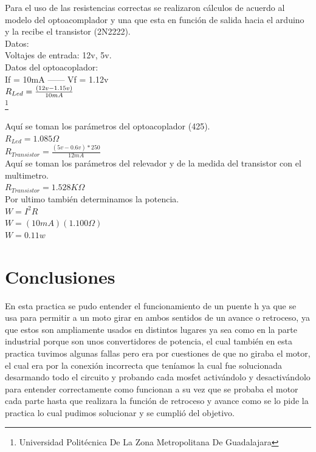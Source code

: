 \documentclass[10pt,a4paper]{article}
\begin{document}
Para el uso de las resistencias correctas se realizaron cálculos de acuerdo al modelo del optoacomplador y una que esta en función de salida hacia el arduino y la recibe el transistor (2N2222).\\
Datos:\\

Voltajes de entrada: 12v, 5v.\\

Datos del optoacoplador:\\

If = 10mA ------
Vf = 1.12v\\

{\Large $ R_{Led} = {\Large \frac{(12v - 1.15v)}{10mA}}$} \\


\footnote{Universidad Politécnica De La Zona Metropolitana De Guadalajara}
\newpage

Aquí se toman los parámetros del optoacoplador (425).\\

{\Large $R_{Led} = 1.085\Omega$}\\

{\Large $R_{Transistor} = \frac{(5v - 0.6v)*250}{12mA}$}\\

Aquí se toman los parámetros del relevador y de la medida del transistor con el multimetro.\\

{\Large $R_{Transistor} = 1.528K\Omega$}\\

Por ultimo también determinamos la potencia.\\

$ W = I^2 R $\\ 

$ W = (10mA)(1.100\Omega)$\\

$ W = 0.11w $\\

\section{Conclusiones}
En esta practica se pudo entender el funcionamiento de un puente h ya que se usa para permitir a un moto girar en ambos sentidos de un avance o retroceso, ya que estos son ampliamente usados en distintos lugares ya sea como en la parte industrial porque son unos convertidores de potencia, el cual también en esta practica tuvimos algunas fallas pero era por cuestiones de que no giraba el motor, el cual era por la conexión incorrecta que teníamos la cual fue solucionada desarmando todo el circuito y probando cada mosfet activándolo y desactivándolo para entender correctamente como funcionan a su vez que se probaba el motor cada parte hasta que realizara la función de retroceso y avance como se lo pide la practica lo cual pudimos solucionar y se cumplió del objetivo.
\end{document}
